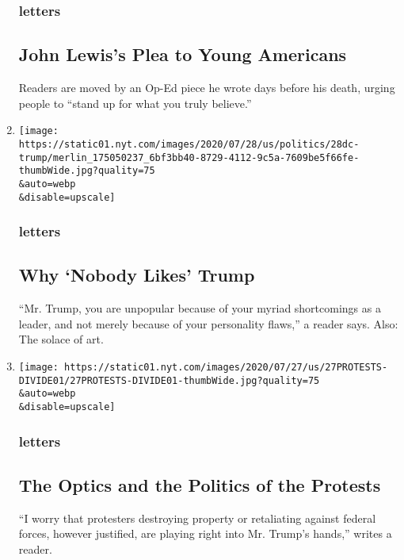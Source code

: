 \begin{enumerate}
  \hypertarget{letters-7}{%
  \subsubsection{letters}\label{letters-7}}

  \hypertarget{john-lewiss-plea-to-young-americans}{%
  \subsection{John Lewis's Plea to Young
  Americans}\label{john-lewiss-plea-to-young-americans}}

  Readers are moved by an Op-Ed piece he wrote days before his death,
  urging people to ``stand up for what you truly believe.''
\item
  \href{/2020/07/30/opinion/letters/trump-personality.html}{}

  \texttt{[image: https://static01.nyt.com/images/2020/07/28/us/politics/28dc-trump/merlin\_175050237\_6bf3bb40-8729-4112-9c5a-7609be5f66fe-thumbWide.jpg?quality=75\\\&auto=webp\\\&disable=upscale]}

  \hypertarget{letters-8}{%
  \subsubsection{letters}\label{letters-8}}

  \hypertarget{why-nobody-likes-trump}{%
  \subsection{Why `Nobody Likes' Trump}\label{why-nobody-likes-trump}}

  ``Mr. Trump, you are unpopular because of your myriad shortcomings as
  a leader, and not merely because of your personality flaws,'' a reader
  says. Also: The solace of art.
\item
  \href{/2020/07/29/opinion/letters/protests-portland.html}{}

  \texttt{[image: https://static01.nyt.com/images/2020/07/27/us/27PROTESTS-DIVIDE01/27PROTESTS-DIVIDE01-thumbWide.jpg?quality=75\\\&auto=webp\\\&disable=upscale]}

  \hypertarget{letters-9}{%
  \subsubsection{letters}\label{letters-9}}

  \hypertarget{the-optics-and-the-politics-of-the-protests}{%
  \subsection{The Optics and the Politics of the
  Protests}\label{the-optics-and-the-politics-of-the-protests}}

  ``I worry that protesters destroying property or retaliating against
  federal forces, however justified, are playing right into Mr. Trump's
  hands,'' writes a reader.
\end{enumerate}

